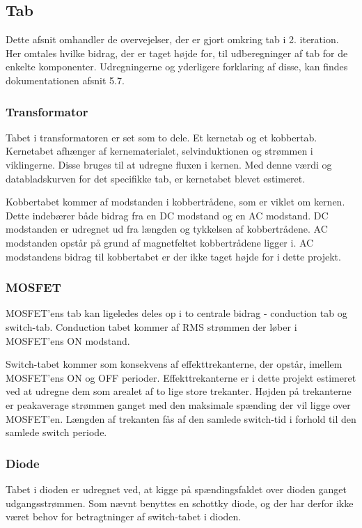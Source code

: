 \subsection{Tab} \label{tab}
Dette afsnit omhandler de overvejelser, der er gjort omkring tab i 2. iteration. Her omtales hvilke bidrag, der er taget højde for, til udberegninger af tab for de enkelte komponenter. Udregningerne og yderligere forklaring af disse, kan findes dokumentationen afsnit 5.7.

\subsubsection{Transformator}
\noindent Tabet i transformatoren er set som to dele. Et kernetab og et kobbertab. Kernetabet afhænger af  kernematerialet, selvinduktionen og strømmen i viklingerne. Disse bruges til at udregne fluxen i kernen. Med denne værdi og databladskurven for det specifikke tab, er kernetabet blevet estimeret. 

Kobbertabet kommer af modstanden i kobbertrådene, som er viklet om kernen. Dette indebærer både bidrag fra en DC modstand og en AC modstand. DC modstanden er udregnet ud fra længden og tykkelsen af kobbertrådene. AC modstanden opstår på grund af magnetfeltet kobbertrådene ligger i. AC modstandens bidrag til kobbertabet er der ikke taget højde for i dette projekt.  

\subsubsection{MOSFET}
\noindent MOSFET'ens tab kan ligeledes deles op i to centrale bidrag - conduction tab og switch-tab. Conduction tabet kommer af RMS strømmen der løber i MOSFET'ens ON modstand. 

Switch-tabet kommer som konsekvens af effekttrekanterne, der opstår, imellem MOSFET'ens ON og OFF perioder. Effekttrekanterne er i dette projekt estimeret ved at udregne dem som arealet af to lige store trekanter. Højden på trekanterne er peakaverage strømmen ganget med den maksimale spænding der vil ligge over MOSFET'en. Længden af trekanten fås af den samlede switch-tid i forhold til den samlede switch periode. 

\subsubsection{Diode}
\noindent Tabet i dioden er udregnet ved, at kigge på spændingsfaldet over dioden ganget udgangsstrømmen. Som nævnt benyttes en schottky diode, og der har derfor ikke været behov for betragtninger af switch-tabet i dioden. 
  

